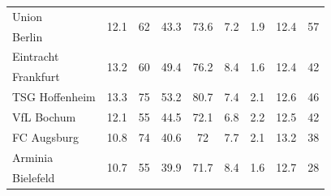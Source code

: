 \begin{table}[t]
\begin{tabular}{lccccccc|c}
Union         & \multirow{2}{*}{12.1}        & \multirow{2}{*}{62}          & \multirow{2}{*}{43.3}            & \multirow{2}{*}{73.6}    & \multirow{2}{*}{7.2}            & \multirow{2}{*}{1.9}            & \multirow{2}{*}{12.4}         & \multirow{2}{*}{57}     \\
Berlin        &                              &                              &                                  &                          &                                 &                                 &                               &                         \\
Eintracht     & \multirow{2}{*}{13.2}        & \multirow{2}{*}{60}          & \multirow{2}{*}{49.4}            & \multirow{2}{*}{76.2}    & \multirow{2}{*}{8.4}            & \multirow{2}{*}{1.6}            & \multirow{2}{*}{12.4}         & \multirow{2}{*}{42}     \\
Frankfurt     &                              &                              &                                  &                          &                                 &                                 &                               &                         \\
TSG Hoffenheim    & \multicolumn{1}{c}{13.3}     & \multicolumn{1}{c}{75}       & \multicolumn{1}{c}{53.2}         & \multicolumn{1}{c}{80.7} & \multicolumn{1}{c}{7.4}         & \multicolumn{1}{c}{2.1}         & \multicolumn{1}{c|}{12.6}     & \multicolumn{1}{c}{46}  \\
VfL Bochum        & \multicolumn{1}{c}{12.1}     & \multicolumn{1}{c}{55}       & \multicolumn{1}{c}{44.5}         & \multicolumn{1}{c}{72.1} & \multicolumn{1}{c}{6.8}         & \multicolumn{1}{c}{2.2}         & \multicolumn{1}{c|}{12.5}     & \multicolumn{1}{c}{42}  \\
FC Augsburg      & \multicolumn{1}{c}{10.8}     & \multicolumn{1}{c}{74}       & \multicolumn{1}{c}{40.6}         & \multicolumn{1}{c}{72}   & \multicolumn{1}{c}{7.7}         & \multicolumn{1}{c}{2.1}         & \multicolumn{1}{c|}{13.2}     & \multicolumn{1}{c}{38}  \\
Arminia       & \multirow{2}{*}{10.7}        & \multirow{2}{*}{55}          & \multirow{2}{*}{39.9}            & \multirow{2}{*}{71.7}    & \multirow{2}{*}{8.4}            & \multirow{2}{*}{1.6}            & \multirow{2}{*}{12.7}         & \multirow{2}{*}{28}     \\
Bielefeld     &                              &                              &                                  &                          &                                 &                                 &                               &                         \\

\end{tabular}
\end{table}
